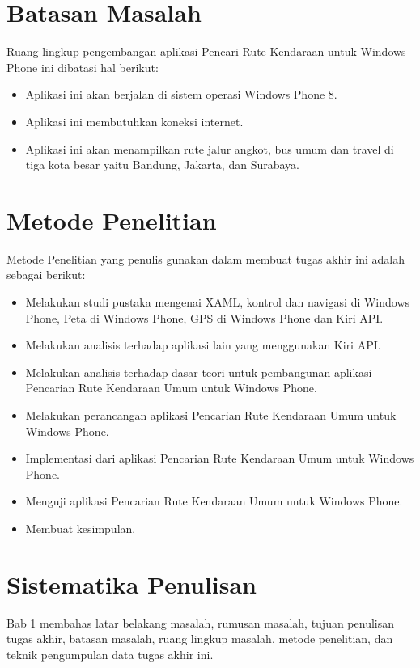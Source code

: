 \section{Batasan Masalah}
\label{sec:batasan_masalah}
Ruang lingkup pengembangan aplikasi Pencari Rute Kendaraan untuk Windows Phone ini dibatasi hal berikut:
\begin{itemize}
	\item Aplikasi ini akan berjalan di sistem operasi Windows Phone 8.
	\item Aplikasi ini membutuhkan koneksi internet.
	\item Aplikasi ini akan menampilkan rute jalur angkot, bus umum dan travel di tiga kota besar yaitu Bandung, Jakarta, dan Surabaya.  
\end{itemize}

\section{Metode Penelitian}
\label{sec:metode_penelitian}
Metode Penelitian yang penulis gunakan dalam membuat tugas akhir ini adalah sebagai berikut:
\begin{itemize}
	\item Melakukan studi pustaka mengenai XAML, kontrol dan navigasi di Windows Phone, Peta di Windows Phone, GPS di Windows Phone dan Kiri API.
	\item Melakukan analisis terhadap aplikasi lain yang menggunakan Kiri API.
	\item Melakukan analisis terhadap dasar teori untuk pembangunan aplikasi Pencarian Rute Kendaraan Umum untuk Windows Phone.
	\item Melakukan perancangan aplikasi Pencarian Rute Kendaraan Umum untuk Windows Phone.
	\item Implementasi dari aplikasi Pencarian Rute Kendaraan Umum untuk Windows Phone.
	\item Menguji aplikasi Pencarian Rute Kendaraan Umum untuk Windows Phone.
	\item Membuat kesimpulan.
\end{itemize}


\section{Sistematika Penulisan}
\label{sec:sistematika_penulisan}
\hspace{0.5cm} Bab 1 membahas latar belakang masalah, rumusan masalah, tujuan penulisan tugas akhir, batasan masalah, ruang lingkup masalah, metode penelitian, dan teknik pengumpulan data tugas akhir ini.

